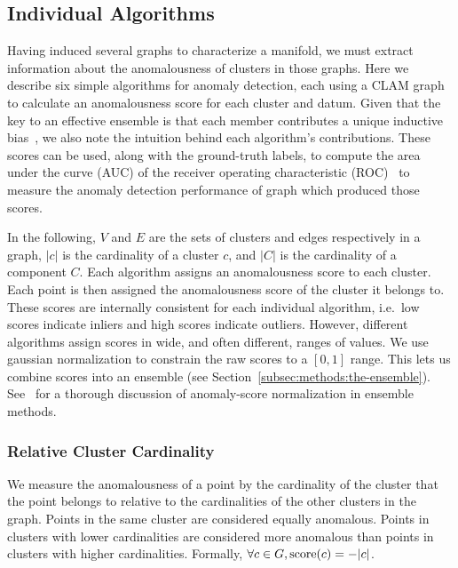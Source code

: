 \subsection{Individual Algorithms}
\label{subsec:methods:individual-algorithms}

Having induced several graphs to characterize a manifold, we must extract information about the anomalousness of clusters in those graphs.
Here we describe six simple algorithms for anomaly detection, each using a CLAM graph to calculate an anomalousness score for each cluster and datum.
Given that the key to an effective ensemble is that each member contributes a unique inductive bias~\cite{chen2017outlier}, we also note the intuition behind each algorithm's contributions.
These scores can be used, along with the ground-truth labels, to compute the area under the curve (AUC) of the receiver operating characteristic (ROC)~\cite{fawcett2006introduction} to measure the anomaly detection performance of graph which produced those scores.

In the following,
$V$ and $E$ are the sets of clusters and edges respectively in a graph,
$|c|$ is the cardinality of a cluster $c$,
and $|C|$ is the cardinality of a component $C$.
Each algorithm assigns an anomalousness score to each cluster.
Each point is then assigned the anomalousness score of the cluster it belongs to.
These scores are internally consistent for each individual algorithm, i.e.\ low scores indicate inliers and high scores indicate outliers.
However, different algorithms assign scores in wide, and often different, ranges of values.
We use gaussian normalization to constrain the raw scores to a $[0, 1]$ range.
This lets us combine scores into an ensemble (see Section~\ref{subsec:methods:the-ensemble}).
See~\cite{kriegel2011interpreting} for a thorough discussion of anomaly-score normalization in ensemble methods.


\subsubsection{Relative Cluster Cardinality}
\label{subsubsec:methods:individual-algorithms:relative-cluster-cardinality}
We measure the anomalousness of a point by the cardinality of the cluster that the point belongs to relative to the cardinalities of the other clusters in the graph.
Points in the same cluster are considered equally anomalous.
Points in clusters with lower cardinalities are considered more anomalous than points in clusters with higher cardinalities.
Formally, $\forall c \in G, \operatorname{score}(c) = -|c|$.

